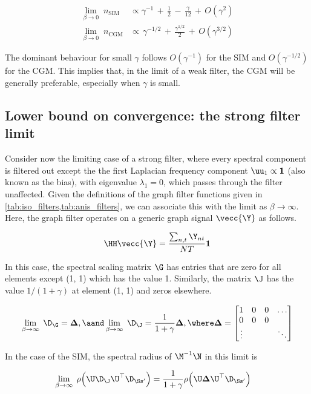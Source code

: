 \begin{align}
    \lim_{\beta \rightarrow 0} \;  n_{\text{SIM}}  \;  &\propto \gamma^{-1} \, + \, \frac{1}{2} \, - \, \frac{\gamma}{12} \, + \, O(\gamma^2) \\[0.5cm]
    \lim_{\beta \rightarrow 0} \;  n_{\text{CGM}} &\propto \, \gamma^{-1/2} \, + \, \frac{\gamma^{1/2}}{2} \, + \, O\left(\gamma^{3/2}\right) 
\end{align}

The dominant behaviour for small $\gamma$ follows $O(\gamma^{-1})$ for the SIM and $O(\gamma^{-1/2})$ for the CGM. This implies that, in the limit of a weak filter, the CGM will be generally preferable, especially when $\gamma$ is small.  


\subsection{Lower bound on convergence: the strong filter limit}

Consider now the limiting case of a strong filter, where every spectral component is filtered out except the the first Laplacian frequency component $\uu_1 \propto \mathbf{1}$ (also known as the bias), with eigenvalue $\lambda_1 = 0$, which passes through the filter unaffected. Given the definitions of the graph filter functions given in \cref{tab:iso_filters,tab:anis_filters}, we can associate this with the limit as $\beta \rightarrow \infty$. Here, the graph filter operates on a generic graph signal $\vecc{\Y}$ as follows. 

$$
\HH \vecc{\Y} = \frac{\sum_{n, t} \Y_{nt}}{NT} \mathbf{1}
$$


In this case, the spectral scaling matrix $\G$ has entries that are zero for all elements except (1, 1) which has the value 1. Similarly, the matrix $\J$ has the value $1 / (1 + \gamma)$ at element (1, 1) and zeros elsewhere. 


$$
\lim_{\beta \rightarrow \infty} \; \D_\G = \mathbf{\Delta}, \aand \lim_{\beta \rightarrow \infty} \; \D_\J = \frac{1}{1 + \gamma} \mathbf{\Delta}, \where     \mathbf{\Delta} = \begin{bmatrix}
    1 & 0 & 0 & \dots \\
    0 & 0 & 0 &  \\
    \vdots & & & \ddots
\end{bmatrix} 
$$

 In the case of the SIM, the spectral radius of $\M^{-1}\N$ in this limit is 

\begin{align*}
    \lim_{\beta \rightarrow \infty} \; \rho\Big(\U \D_\J \U^\top \D_{\Ss'} \Big) &= \frac{1}{1 + \gamma} \rho\Big(\U \mathbf{\Delta} \U^\top \D_{\Ss'} \Big)
\end{align*}

